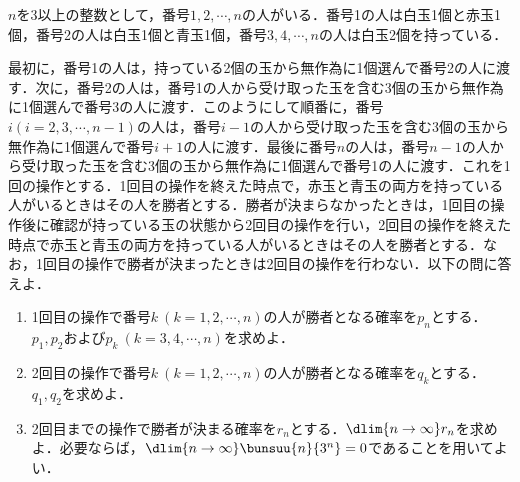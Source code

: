 \begin{problem}
$n$を3以上の整数として，番号$1,2,\cdots,n$の人がいる．番号1の人は白玉1個と赤玉1個，番号2の人は白玉1個と青玉1個，番号$3,4,\cdots,n$の人は白玉2個を持っている．

\quad 最初に，番号1の人は，持っている2個の玉から無作為に1個選んで番号2の人に渡す．次に，番号2の人は，番号1の人から受け取った玉を含む3個の玉から無作為に1個選んで番号3の人に渡す．このようにして順番に，番号$i(i=2,3,\cdots,n-1)$の人は，番号$i-1$の人から受け取った玉を含む3個の玉から無作為に1個選んで番号$i+1$の人に渡す．最後に番号$n$の人は，番号$n-1$の人から受け取った玉を含む3個の玉から無作為に1個選んで番号1の人に渡す．これを1回の操作とする．1回目の操作を終えた時点で，赤玉と青玉の両方を持っている人がいるときはその人を勝者とする．勝者が決まらなかったときは，1回目の操作後に確認が持っている玉の状態から2回目の操作を行い，2回目の操作を終えた時点で赤玉と青玉の両方を持っている人がいるときはその人を勝者とする．なお，1回目の操作で勝者が決まったときは2回目の操作を行わない．以下の問に答えよ．
\begin{enumerate}
  \item 1回目の操作で番号$k\ (k=1,2,\cdots,n)$の人が勝者となる確率を$p_n$とする．$p_1,p_2$および$p_k\ (k=3,4,\cdots,n)$を求めよ．
  \item 2回目の操作で番号$k\ (k=1,2,\cdots,n)$の人が勝者となる確率を$q_k$とする．$q_1,q_2$を求めよ．
  \item 2回目までの操作で勝者が決まる確率を$r_n$とする．$\dlim{n \to \infty}r_n$を求めよ．必要ならば，$\dlim{n \to \infty} \bunsuu{n}{3^n}=0$であることを用いてよい．
\end{enumerate}
\end{problem}
